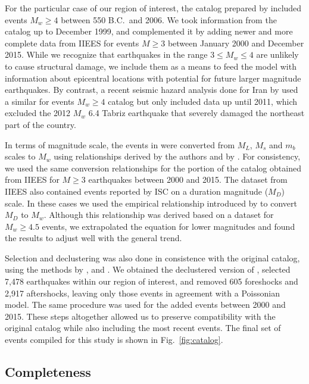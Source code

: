 For the particular case of our region of interest, the catalog prepared by \citet{Zare2014} included events $M_w \geq 4$ between 550 B.C.~and 2006. We took information from the catalog up to December 1999, and complemented it by adding newer and more complete data from IIEES for events $M \geq 3$ between January 2000 and December 2015. While we recognize that earthquakes in the range $3 \leq M_w \leq 4$ are unlikely to cause structural damage, we include them as a means to feed the model with information about epicentral locations with potential for future larger magnitude earthquakes. By contrast, a recent seismic hazard analysis done for Iran by \citet{Khodaverdian_2016_BSSA} used a similar for events $M_w \geq 4$ catalog but only included data up until 2011, which excluded the 2012 $M_w$ 6.4 Tabriz earthquake that severely damaged the northeast part of the country.

In terms of magnitude scale, the events in \citet{Zare2014} were converted from $M_L$, $M_s$ and $m_b$ scales to $M_w$ using relationships derived by the authors and by \citet{Escordilis_2006_JS}. For consistency, we used the same conversion relationships for the portion of the catalog obtained from IIEES for $M \geq 3$ earthquakes between 2000 and 2015. The dataset from IIEES also contained events reported by ISC on a duration magnitude ($M_D$) scale. In these cases we used the empirical relationship introduced by \citet{Deniz2010} to convert $M_D$ to $M_w$. Although this relationship was derived based on a dataset for $M_w \geq 4.5$ events, we extrapolated the equation for lower magnitudes and found the results to adjust well with the general trend. 

Selection and declustering was also done in consistence with the original catalog, using the methods by \citet{Gardner1974}, \citet{Reasenberg1985} and \citet{Uhrhammer_1986_EN}. We obtained the declustered version of \citet{Zare2014}, selected 7,478 earthquakes within our region of interest, and removed 605 foreshocks and 2,917 aftershocks, leaving only those events in agreement with a Poissonian model. The same procedure was used for the added events between 2000 and 2015. These steps altogether allowed us to preserve compatibility with the original catalog while also including the most recent events. The final set of events compiled for this study is shown in Fig.~\ref{fig:catalog}.

\subsection{Completeness}

